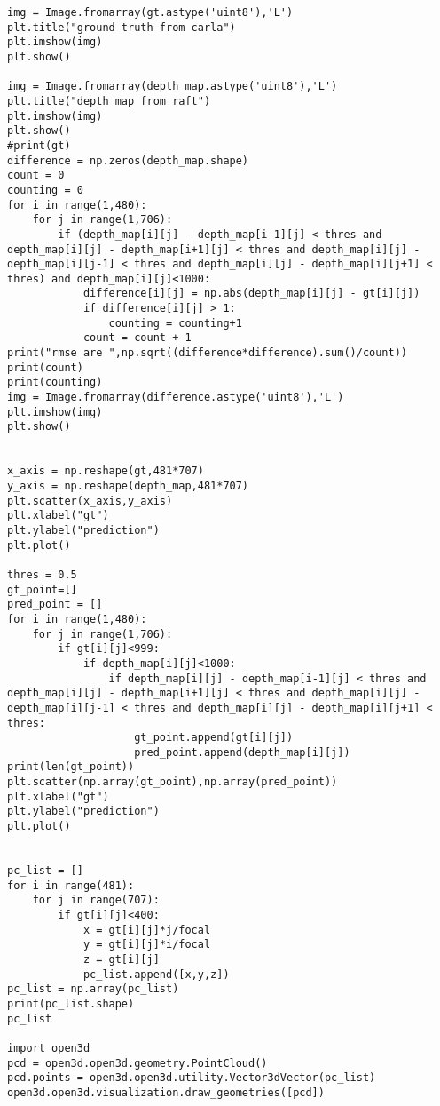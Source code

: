 \begin{verbatim}
img = Image.fromarray(gt.astype('uint8'),'L')
plt.title("ground truth from carla")
plt.imshow(img)
plt.show()

img = Image.fromarray(depth_map.astype('uint8'),'L')
plt.title("depth map from raft")
plt.imshow(img)
plt.show()
#print(gt)
difference = np.zeros(depth_map.shape)
count = 0
counting = 0
for i in range(1,480):
    for j in range(1,706):
        if (depth_map[i][j] - depth_map[i-1][j] < thres and depth_map[i][j] - depth_map[i+1][j] < thres and depth_map[i][j] - depth_map[i][j-1] < thres and depth_map[i][j] - depth_map[i][j+1] < thres) and depth_map[i][j]<1000:
            difference[i][j] = np.abs(depth_map[i][j] - gt[i][j])
            if difference[i][j] > 1:
                counting = counting+1
            count = count + 1
print("rmse are ",np.sqrt((difference*difference).sum()/count))
print(count)
print(counting)
img = Image.fromarray(difference.astype('uint8'),'L')
plt.imshow(img)
plt.show()


x_axis = np.reshape(gt,481*707)
y_axis = np.reshape(depth_map,481*707)
plt.scatter(x_axis,y_axis)
plt.xlabel("gt")
plt.ylabel("prediction")
plt.plot()

thres = 0.5
gt_point=[]
pred_point = []
for i in range(1,480):
    for j in range(1,706):
        if gt[i][j]<999:
            if depth_map[i][j]<1000:
                if depth_map[i][j] - depth_map[i-1][j] < thres and depth_map[i][j] - depth_map[i+1][j] < thres and depth_map[i][j] - depth_map[i][j-1] < thres and depth_map[i][j] - depth_map[i][j+1] < thres:
                    gt_point.append(gt[i][j])
                    pred_point.append(depth_map[i][j])
print(len(gt_point))
plt.scatter(np.array(gt_point),np.array(pred_point))
plt.xlabel("gt")
plt.ylabel("prediction")
plt.plot()


pc_list = []
for i in range(481):
    for j in range(707):
        if gt[i][j]<400:
            x = gt[i][j]*j/focal
            y = gt[i][j]*i/focal
            z = gt[i][j]
            pc_list.append([x,y,z])
pc_list = np.array(pc_list)
print(pc_list.shape)
pc_list

import open3d
pcd = open3d.open3d.geometry.PointCloud()
pcd.points = open3d.open3d.utility.Vector3dVector(pc_list)
open3d.open3d.visualization.draw_geometries([pcd])
\end{verbatim}
\newpage
